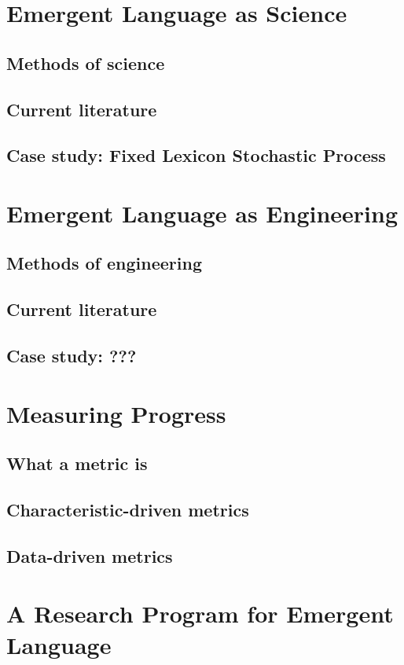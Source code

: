 \documentclass[letterpaper]{report}
\begin{document}
\chapter{Emergent Language as Science}
\section{Methods of science}
\section{Current literature}
\section{Case study: Fixed Lexicon Stochastic Process}

\chapter{Emergent Language as Engineering}
\section{Methods of engineering}
\section{Current literature}
\section{Case study: ???}

\chapter{Measuring Progress}
\section{What a metric is}
\section{Characteristic-driven metrics}
\section{Data-driven metrics}

\chapter{A Research Program for Emergent Language}
\end{document}
